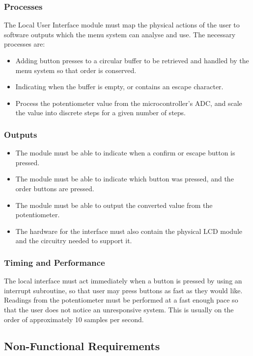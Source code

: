 \documentclass[]{report}
\begin{document}
\subsubsection{Processes}
The Local User Interface module must map the physical actions of the user to software outputs which the menu system can analyse and use. The necessary processes are:

\begin{itemize}
	\item Adding button presses to a circular buffer to be retrieved and handled by the menu system so that order is conserved.
	\item Indicating when the buffer is empty, or contains an escape character. 
	\item Process the potentiometer value from the microcontroller's ADC, and scale the value into discrete steps for a given number of steps.
\end{itemize} 
\subsubsection{Outputs}
\begin{itemize}
	\item The module must be able to indicate when a confirm or escape button is pressed.
	\item The module must be able to indicate which button was pressed, and the order buttons are pressed.
	\item The module must be able to output the converted value from the potentiometer. 
	\item The hardware for the interface must also contain the physical LCD module and the circuitry needed to support it.
\end{itemize}
\subsubsection{Timing and Performance}
The local interface must act immediately when a button is pressed by using an interrupt subroutine, so that user may press buttons as fast as they would like. Readings from the potentiometer must be performed at a fast enough pace so that the user does not notice an unresponsive system. This is usually on the order of approximately 10 samples per second.

\subsection{Non-Functional Requirements}
\end{document}

